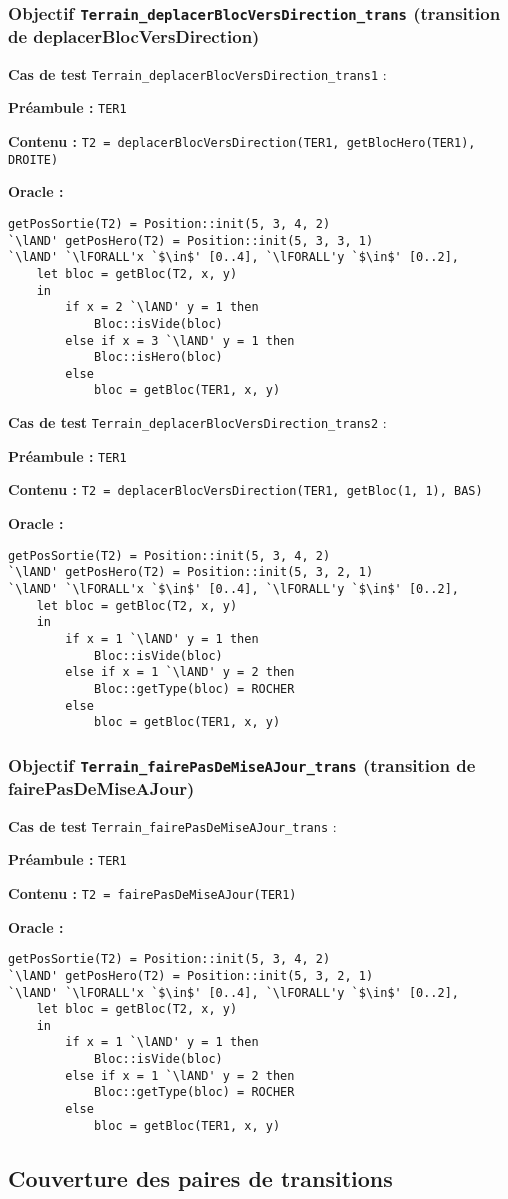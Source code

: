 \documentclass{article}
\newcommand{\cmd}[1]{\texttt{#1}}
\newcommand{\lAND}{$\land$}
\newcommand{\lFORALL}{$\forall$}
\newcommand{\obj}[2]{\subsubsection*{\large{\textbf{Objectif {\cmd{#1} (#2)}}}}}
\newenvironment{cas}[1]
{
	\hspace{1em}\textbf{Cas de test} \cmd{#1} :
	\begin{list}{}{}
}{
	\end{list}\vspace{1em}
}
\newcommand{\pre}[1]{\item \textbf{Préambule :} \cmd{#1}}
\newcommand{\ope}[1]{\item \textbf{Contenu :} \cmd{#1}}
\newcommand{\oram}{\item \textbf{Oracle :}}
\begin{document}
\obj{Terrain\_deplacerBlocVersDirection\_trans} {transition de deplacerBlocVersDirection}
	\begin{cas} {Terrain\_deplacerBlocVersDirection\_trans1}
		\pre{TER1}
		\ope{T2 = deplacerBlocVersDirection(TER1, getBlocHero(TER1), DROITE)}
		\oram{}
		\begin{lstlisting}
getPosSortie(T2) = Position::init(5, 3, 4, 2)
`\lAND' getPosHero(T2) = Position::init(5, 3, 3, 1)
`\lAND' `\lFORALL'x `$\in$' [0..4], `\lFORALL'y `$\in$' [0..2],
	let bloc = getBloc(T2, x, y)
	in
		if x = 2 `\lAND' y = 1 then
			Bloc::isVide(bloc)
		else if x = 3 `\lAND' y = 1 then
			Bloc::isHero(bloc)
		else
			bloc = getBloc(TER1, x, y)
		\end{lstlisting}
	\end{cas}

	\begin{cas} {Terrain\_deplacerBlocVersDirection\_trans2}
		\pre{TER1}
		\ope{T2 = deplacerBlocVersDirection(TER1, getBloc(1, 1), BAS)}
		\oram{}
		\begin{lstlisting}
getPosSortie(T2) = Position::init(5, 3, 4, 2)
`\lAND' getPosHero(T2) = Position::init(5, 3, 2, 1)
`\lAND' `\lFORALL'x `$\in$' [0..4], `\lFORALL'y `$\in$' [0..2],
	let bloc = getBloc(T2, x, y)
	in
		if x = 1 `\lAND' y = 1 then
			Bloc::isVide(bloc)
		else if x = 1 `\lAND' y = 2 then
			Bloc::getType(bloc) = ROCHER
		else
			bloc = getBloc(TER1, x, y)
		\end{lstlisting}
	\end{cas}

\obj{Terrain\_fairePasDeMiseAJour\_trans} {transition de fairePasDeMiseAJour}
	\begin{cas} {Terrain\_fairePasDeMiseAJour\_trans}
		\pre{TER1}
		\ope{T2 = fairePasDeMiseAJour(TER1)}
		\oram{}
		\begin{lstlisting}
getPosSortie(T2) = Position::init(5, 3, 4, 2)
`\lAND' getPosHero(T2) = Position::init(5, 3, 2, 1)
`\lAND' `\lFORALL'x `$\in$' [0..4], `\lFORALL'y `$\in$' [0..2],
	let bloc = getBloc(T2, x, y)
	in
		if x = 1 `\lAND' y = 1 then
			Bloc::isVide(bloc)
		else if x = 1 `\lAND' y = 2 then
			Bloc::getType(bloc) = ROCHER
		else
			bloc = getBloc(TER1, x, y)
		\end{lstlisting}
	\end{cas}


\subsection{Couverture des paires de transitions}
\end{document}
